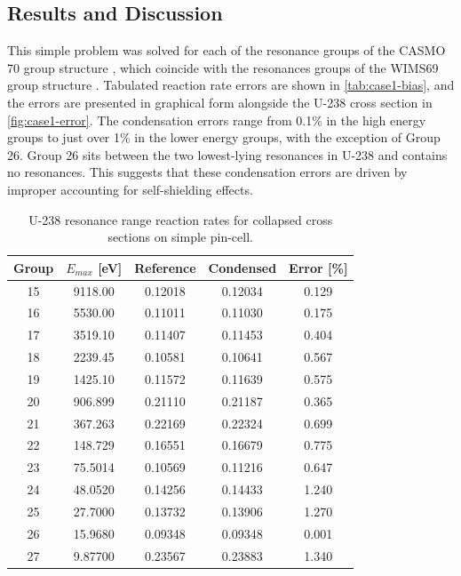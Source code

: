 \subsection{Results and Discussion}
\label{subsec:results-case1}

This simple problem was solved for each of the resonance groups of the CASMO 70 group structure \citep{rhodes2006casmo}, which coincide with the resonances groups of the WIMS69 group structure \citep{knott2010lattice}.  Tabulated reaction rate errors are shown in \autoref{tab:case1-bias}, and the errors are presented in graphical form alongside the U-238 cross section in \autoref{fig:case1-error}.  The condensation errors range from 0.1\% in the high energy groups to just over 1\% in the lower energy groups, with the exception of Group 26.  Group 26 sits between the two lowest-lying resonances in U-238 and contains no resonances.  This suggests that these condensation errors are driven by improper accounting for self-shielding effects.

\begin{table}[h!]
  \centering
  \caption{U-238 resonance range reaction rates for collapsed cross sections on simple pin-cell.}
  \label{tab:case1-bias} 
  \begin{tabular}{c c c c c}
  \toprule
  \textbf{Group} & \textbf{\boldmath$E_{max}$ [eV]} & \textbf{Reference} & \textbf{Condensed} & \textbf{Error [\%]} \\
  \midrule
  15 & 9118.00 & 0.12018 & 0.12034 & 0.129 \\
  16 & 5530.00 & 0.11011 & 0.11030 & 0.175 \\
  17 & 3519.10 & 0.11407 & 0.11453 & 0.404 \\
  18 & 2239.45 & 0.10581 & 0.10641 & 0.567 \\
  19 & 1425.10 & 0.11572 & 0.11639 & 0.575 \\
  20 & 906.899 & 0.21110 & 0.21187 & 0.365 \\
  21 & 367.263 & 0.22169 & 0.22324 & 0.699 \\
  22 & 148.729 & 0.16551 & 0.16679 & 0.775 \\
  23 & 75.5014 & 0.10569 & 0.11216 & 0.647 \\
  24 & 48.0520 & 0.14256 & 0.14433 & 1.240 \\
  25 & 27.7000 & 0.13732 & 0.13906 & 1.270 \\
  26 & 15.9680 & 0.09348 & 0.09348 & 0.001 \\
  27 & 9.87700 & 0.23567 & 0.23883 & 1.340 \\
  \bottomrule
\end{tabular}
\end{table}

